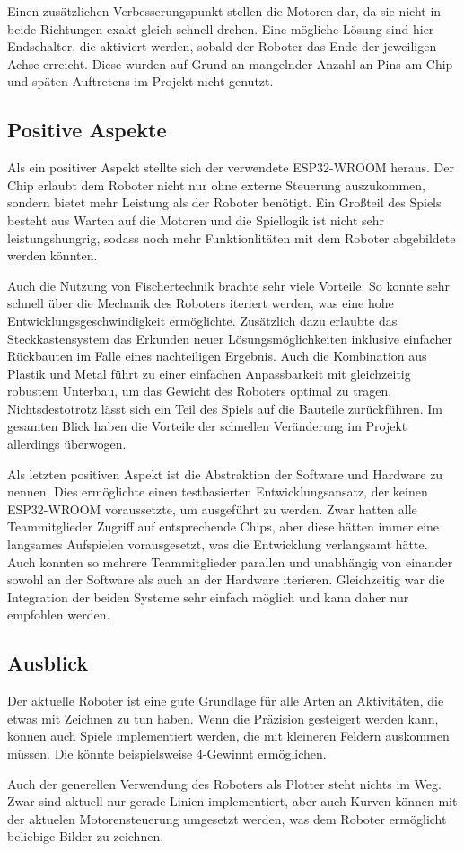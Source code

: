 \documentclass[conference,compsoc,final,a4paper]{IEEEtran}
\begin{document}
Einen zusätzlichen Verbesserungspunkt stellen die Motoren dar, da sie nicht in beide Richtungen exakt gleich schnell drehen. Eine
mögliche Lösung sind hier Endschalter, die aktiviert werden, sobald der Roboter das Ende der jeweiligen Achse erreicht. Diese wurden
auf Grund an mangelnder Anzahl an Pins am Chip und späten Auftretens im Projekt nicht genutzt.

\subsection{Positive Aspekte}

Als ein positiver Aspekt stellte sich der verwendete ESP32-WROOM heraus. Der Chip erlaubt dem Roboter nicht nur ohne externe Steuerung
auszukommen, sondern bietet mehr Leistung als der Roboter benötigt. Ein Großteil des Spiels besteht aus Warten auf die Motoren und die
Spiellogik ist nicht sehr leistungshungrig, sodass noch mehr Funktionlitäten mit dem Roboter abgebildete werden könnten.

Auch die Nutzung von Fischertechnik brachte sehr viele Vorteile. So konnte sehr schnell über die Mechanik des Roboters iteriert werden,
was eine hohe Entwicklungsgeschwindigkeit ermöglichte. Zusätzlich dazu erlaubte das Steckkastensystem das Erkunden neuer Lösungsmöglichkeiten
inklusive einfacher Rückbauten im Falle eines nachteiligen Ergebnis. Auch die Kombination aus Plastik und Metal führt zu einer einfachen 
Anpassbarkeit mit gleichzeitig robustem Unterbau, um das Gewicht des Roboters optimal zu tragen. Nichtsdestotrotz lässt sich ein Teil des
Spiels auf die Bauteile zurückführen. Im gesamten Blick haben die Vorteile der schnellen Veränderung im Projekt allerdings überwogen.

Als letzten positiven Aspekt ist die Abstraktion der Software und Hardware zu nennen. Dies ermöglichte einen testbasierten
Entwicklungsansatz, der keinen ESP32-WROOM voraussetzte, um ausgeführt zu werden. Zwar hatten alle Teammitglieder Zugriff auf entsprechende
Chips, aber diese hätten immer eine langsames Aufspielen vorausgesetzt, was die Entwicklung verlangsamt hätte. Auch konnten so mehrere
Teammitglieder parallen und unabhängig von einander sowohl an der Software als auch an der Hardware iterieren. Gleichzeitig war die
Integration der beiden Systeme sehr einfach möglich und kann daher nur empfohlen werden.

\subsection{Ausblick}

Der aktuelle Roboter ist eine gute Grundlage für alle Arten an Aktivitäten, die etwas mit Zeichnen zu tun haben. Wenn die Präzision
gesteigert werden kann, können auch Spiele implementiert werden, die mit kleineren Feldern auskommen müssen. Die könnte beispielsweise
4-Gewinnt ermöglichen.

Auch der generellen Verwendung des Roboters als Plotter steht nichts im Weg. Zwar sind aktuell nur gerade Linien implementiert, aber
auch Kurven können mit der aktuelen Motorensteuerung umgesetzt werden, was dem Roboter ermöglicht beliebige Bilder zu zeichnen.

\printbibliography
\end{document}
